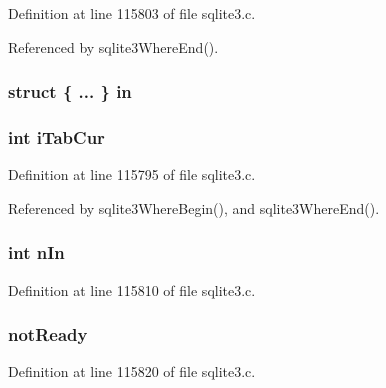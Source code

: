 Definition at line 115803 of file sqlite3.\+c.



Referenced by sqlite3\+Where\+End().

\hypertarget{struct_where_level_ad1f454e084d0af91edb9f23999732cec}{}
\subsubsection[{in}]{\setlength{\rightskip}{0pt plus 5cm}struct \{ ... \}   in}\label{struct_where_level_ad1f454e084d0af91edb9f23999732cec}
\hypertarget{struct_where_level_a103f2fe41869e2e93ecca3ab667b0a5a}{}
\subsubsection[{i\+Tab\+Cur}]{\setlength{\rightskip}{0pt plus 5cm}int i\+Tab\+Cur}\label{struct_where_level_a103f2fe41869e2e93ecca3ab667b0a5a}


Definition at line 115795 of file sqlite3.\+c.



Referenced by sqlite3\+Where\+Begin(), and sqlite3\+Where\+End().

\hypertarget{struct_where_level_a38d379d826c7b4c49ecb1127003d77ec}{}
\subsubsection[{n\+In}]{\setlength{\rightskip}{0pt plus 5cm}int n\+In}\label{struct_where_level_a38d379d826c7b4c49ecb1127003d77ec}


Definition at line 115810 of file sqlite3.\+c.

\hypertarget{struct_where_level_a432cf7620a98e0241a9e3a773683b603}{}
\subsubsection[{not\+Ready}]{ not\+Ready}\label{struct_where_level_a432cf7620a98e0241a9e3a773683b603}


Definition at line 115820 of file sqlite3.\+c.

